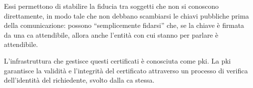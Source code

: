 Essi permettono di stabilire la fiducia tra soggetti che non si conoscono direttamente, in modo tale che non debbano scambiarsi le chiavi pubbliche prima della comunicazione: possono \enquote{semplicemente fidarsi} che, se la chiave è firmata da una \acrshort{ca} attendibile, allora anche l'entità con cui stanno per parlare è attendibile. 

L'infrastruttura che gestisce questi certificati è conosciuta come \acrfull{pki}. La \acrshort{pki} garantisce la validità e l'integrità del certificato attraverso un processo di verifica dell'identità del richiedente, svolto dalla \acrshort{ca} stessa.